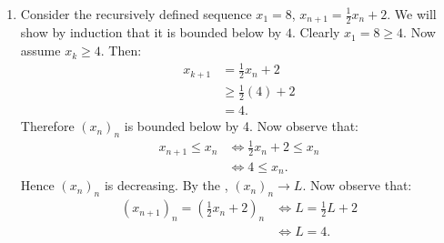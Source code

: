     \begin{example}
        \phantom{a}
        \begin{enumerate}[label = (\arabic*)]
            \item Consider the recursively defined sequence $x_1 = 8$, $x_{n+1} = \frac{1}{2}x_n + 2$. We will show by induction that it is bounded below by $4$. Clearly $x_1 = 8 \geq 4$. Now assume $x_k \geq 4$. Then:
                \begin{equation*}
                \begin{split}
                    x_{k+1} &= \frac{1}{2}x_n + 2 \\
                    & \geq \frac{1}{2}(4) + 2 \\
                    & = 4.
                \end{split}
                \end{equation*}
            Therefore $(x_n)_n$ is bounded below by 4. Now observe that:
                \begin{equation*}
                \begin{split}
                    x_{n+1} \leq x_n 
                    &\iff \frac{1}{2}x_n + 2 \leq x_n \\
                    &\iff 4 \leq x_n.
                \end{split}
                \end{equation*}
            Hence $(x_n)_n$ is decreasing. By the , $(x_n)_n \rightarrow L$. Now observe that:
                \begin{equation*}
                \begin{split}
                    (x_{n+1})_n = \left(\frac{1}{2}x_n + 2\right)_n 
                    &\iff L = \frac{1}{2}L + 2 \\
                    &\iff L = 4.
                \end{split}
                \end{equation*}


\end{enumerate}
\end{example}
